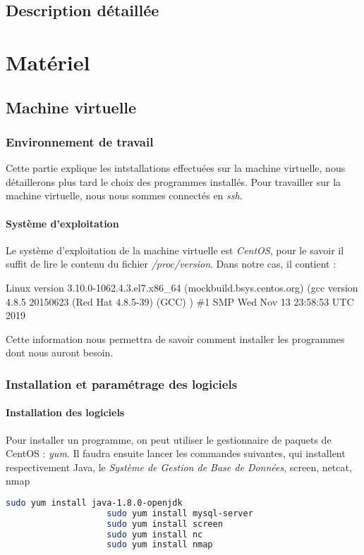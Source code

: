 \section{Description détaillée}
\chapter{Matériel}
\section{Machine virtuelle}
	\subsection{Environnement de travail}
		Cette partie explique les intstallations effectuées sur la machine virtuelle, nous détaillerons plus tard le choix des programmes installés.
		Pour travailler sur la machine virtuelle, nous nous sommes connectés en \emph{ssh}.
		\subsubsection{Système d'exploitation}
			Le système d'exploitation de la machine virtuelle est \emph{CentOS}, pour le savoir il suffit de lire le contenu du fichier \emph{/proc/version}.
			Dans notre cas, il contient : 
			\begin{mdframed}[backgroundcolor=light-gray, roundcorner=20pt,
				leftmargin=0, rightmargin=0, 
				innerleftmargin=20, linecolor=darkgray]
				Linux version 3.10.0-1062.4.3.el7.x86\_64 (mockbuild\@kbuilder.bsys.centos.org) (gcc version 4.8.5 20150623 (Red Hat 4.8.5-39) (GCC) ) \#1 SMP Wed Nov 13 23:58:53 UTC 2019
			\end{mdframed}
			Cette information nous permettra de savoir comment installer les programmes dont nous auront besoin.
	\subsection{Installation et paramétrage des logiciels}
		\subsubsection{Installation des logiciels}
			Pour installer un programme, on peut utiliser le gestionnaire de paquets de CentOS : \emph{yum}.
			Il faudra ensuite lancer les commandes suivantes, qui installent respectivement Java, le \emph{Système de Gestion de Base de Données}, screen, netcat, nmap
			\begin{mdframed}[backgroundcolor=light-gray, roundcorner=20pt,
				leftmargin=0, rightmargin=0, 
				innerleftmargin=20, linecolor=darkgray]
				\begin{lstlisting}[language=bash]
					sudo yum install java-1.8.0-openjdk
					sudo yum install mysql-server
					sudo yum install screen
					sudo yum install nc
					sudo yum install nmap
				\end{lstlisting}
			\end{mdframed}
